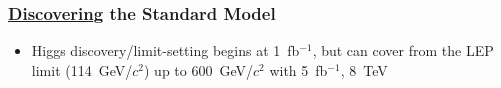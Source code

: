 \documentclass[compress]{beamer}
\begin{document}
\begin{frame}
\frametitle{\underline{\bf Discovering} the Standard Model}
\begin{itemize}
\item Higgs discovery/limit-setting begins at 1~fb$^{-1}$, but can
  cover from the LEP limit (114~GeV/$c^2$) up to 600~GeV/$c^2$ with
  5~fb$^{-1}$, 8~TeV
\end{itemize}

\mbox{\hspace{-1.3 cm} }


\end{frame}
\end{document}
